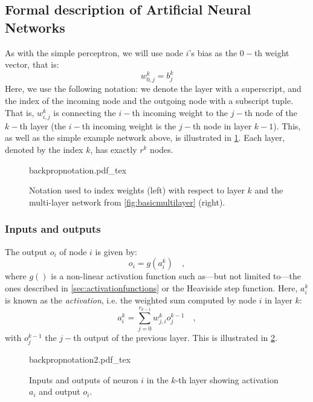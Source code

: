 \subsection{Formal description of Artificial Neural Networks}

As with the simple perceptron, we will use node $i$'s bias as the $0-$th weight vector, that is:
\begin{equation}
w^k_{0,j}=b^k_j
\end{equation}
Here, we use the following notation: we denote the layer with a superscript, and the index of the incoming node and the outgoing node with a subscript tuple.
That is, $w^k_{i,j}$ is connecting the $i-$th incoming weight to the $j-$th node of the $k-$th layer (the $i-$th incoming weight is the $j-$th node in layer $k-1$). This, as well as the simple example network above, is illustrated in \cref{fig:backpropnotation}.
Each layer, denoted by the index $k$, has exactly $r^k$ nodes.
\begin{figure}[htb]
    \centering
    \def\svgwidth{0.7\textwidth}
    {backpropnotation.pdf_tex}
    \caption{Notation used to index weights (left) with respect to layer $k$ and the multi-layer network from \cref{fig:basicmultilayer} (right).\label{fig:backpropnotation}}
\end{figure}

\subsubsection{Inputs and outputs}

The output $o_i$ of node $i$ is given by:
\begin{equation}
o_i=g(a_i^k)\quad,
\end{equation}
where $g()$ is a non-linear activation function such as---but not limited to---the ones described in \cref{sec:activationfunctions} or the Heaviside step function. Here, $a_i^k$ is known as the \textsl{activation}, i.e. the weighted sum computed by node $i$ in layer $k$:
\begin{equation}
a_i^k=\sum_{j=0}^{r_{k-1}}w_{j,i}^ko_j^{k-1}\quad,
\end{equation}
with $o_j^{k-1}$ the $j-$th output of the previous layer. This is illustrated in \cref{fig:backpropnotation2}.

\begin{figure}[htb]
    \centering
    \def\svgwidth{0.7\textwidth}
    {backpropnotation2.pdf_tex}
    \caption{Inputs and outputs of neuron $i$ in the $k$-th layer showing activation $a_i$ and output $o_i$.\label{fig:backpropnotation2}}
\end{figure}

